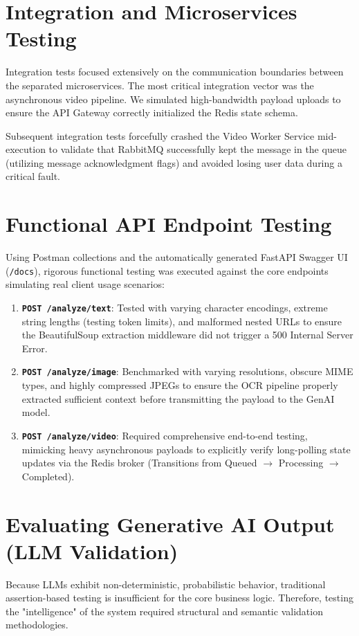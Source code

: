 \section{Integration and Microservices Testing}
Integration tests focused extensively on the communication boundaries between the separated microservices. The most critical integration vector was the asynchronous video pipeline. We simulated high-bandwidth payload uploads to ensure the API Gateway correctly initialized the Redis state schema. 

Subsequent integration tests forcefully crashed the Video Worker Service mid-execution to validate that RabbitMQ successfully kept the message in the queue (utilizing message acknowledgment flags) and avoided losing user data during a critical fault.

\section{Functional API Endpoint Testing}
Using Postman collections and the automatically generated FastAPI Swagger UI (\texttt{/docs}), rigorous functional testing was executed against the core endpoints simulating real client usage scenarios:
\begin{enumerate}
    \item \textbf{\texttt{POST /analyze/text}}: Tested with varying character encodings, extreme string lengths (testing token limits), and malformed nested URLs to ensure the BeautifulSoup extraction middleware did not trigger a 500 Internal Server Error.
    \item \textbf{\texttt{POST /analyze/image}}: Benchmarked with varying resolutions, obscure MIME types, and highly compressed JPEGs to ensure the OCR pipeline properly extracted sufficient context before transmitting the payload to the GenAI model.
    \item \textbf{\texttt{POST /analyze/video}}: Required comprehensive end-to-end testing, mimicking heavy asynchronous payloads to explicitly verify long-polling state updates via the Redis broker (Transitions from Queued $\rightarrow$ Processing $\rightarrow$ Completed).
\end{enumerate}

\section{Evaluating Generative AI Output (LLM Validation)}
Because LLMs exhibit non-deterministic, probabilistic behavior, traditional assertion-based testing is insufficient for the core business logic. Therefore, testing the "intelligence" of the system required structural and semantic validation methodologies.

